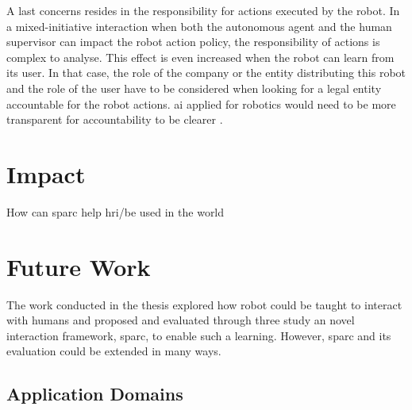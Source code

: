 A last concerns resides in the responsibility for actions executed by the robot. In a mixed-initiative interaction when both the autonomous agent and the human supervisor can impact the robot action policy, the responsibility of actions is complex to analyse. This effect is even increased when the robot can learn from its user. In that case, the role of the company or the entity distributing this robot and the role of the user have to be considered when looking for a legal entity accountable for the robot actions. \gls{ai} applied for robotics would need to be more transparent for accountability to be clearer \citep{wachter2017transparent}.

\section{Impact}

How can sparc help hri/be used in the world

\section{Future Work}

The work conducted in the thesis explored how robot could be taught to interact with humans and proposed and evaluated through three study an novel interaction framework, \gls{sparc}, to enable such a learning. However, \gls{sparc} and its evaluation could be extended in many ways.

\subsection{Application Domains}

